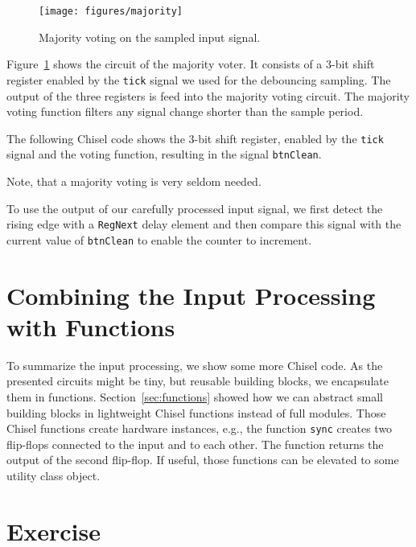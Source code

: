 \documentclass[%
    10pt,
    headinclude, footexclude,
    openright, %
    notitlepage,
    cleardoubleempty,
    headsepline,
    pointlessnumbers,
    bibtotoc, idxtotoc,
    ]{scrbook}
\newcommand{\code}[1]{{\small{\texttt{#1}}}}
\begin{document}
\begin{figure}
  \centering
  \texttt{[image: figures/majority]}
  \caption{Majority voting on the sampled input signal.}
  \label{fig:majority}
\end{figure}

Figure~\ref{fig:majority} shows the circuit of the majority voter.
It consists of a 3-bit shift register enabled by the \code{tick} signal
we used for the debouncing sampling. The output of the three registers
is feed into the majority voting circuit. The majority voting function filters
any signal change shorter than the sample period. 

The following Chisel code shows the 3-bit shift register, enabled by the
\code{tick} signal and the voting function, resulting in the signal \code{btnClean}.

Note, that a majority voting is very seldom needed.


To use the output of our carefully processed input signal, we first detect
the rising edge with a \code{RegNext} delay element and then compare this
signal with the current value of \code{btnClean} to enable the counter to increment.



\section{Combining the Input Processing with Functions}

To summarize the input processing, we show some more Chisel code.
As the presented circuits might be tiny, but reusable building blocks, we encapsulate
them in functions. Section~\ref{sec:functions} showed how we can abstract
small building blocks in lightweight Chisel functions instead of full modules.
Those Chisel functions create hardware instances, e.g., the function
\code{sync} creates two flip-flops connected to the input and to each other.
The function returns the output of the second flip-flop.
If useful, those functions can be elevated to some utility class object.




\section{Exercise}
\end{document}
